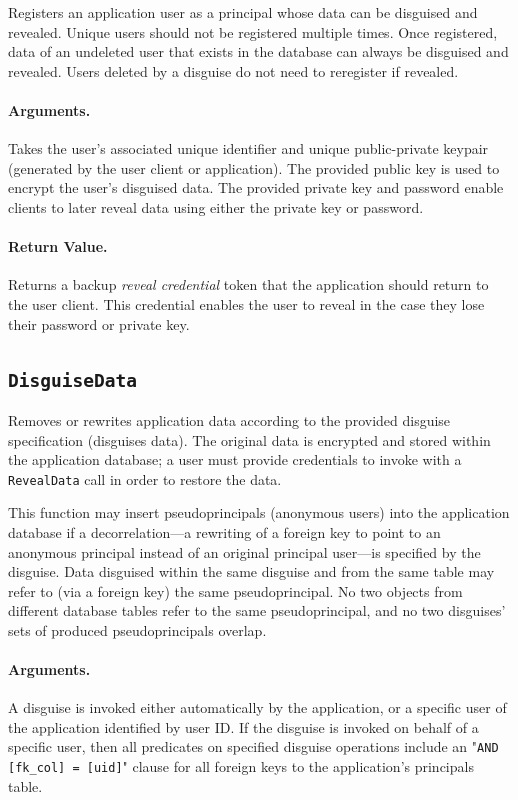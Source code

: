    Registers an application user as a principal whose data can be disguised and
    revealed. Unique users should not be registered multiple times.  Once
    registered, data of an undeleted user that exists in the database can always
    be disguised and revealed.
    Users deleted by a disguise do not need to reregister if revealed.

    \paragraph{Arguments.} Takes the user's associated unique identifier and unique
    public-private keypair (generated by the user
    client or application).
    The provided public key is used to encrypt the user's disguised data. The
    provided private key and password enable clients to later reveal data using
    either the private key or password.

    \paragraph{Return Value.} 
    Returns a backup \emph{reveal credential} token that the application should return to
    the user client. This credential enables the user to reveal in the case they lose
    their password or private key.


\subsection{\texttt{DisguiseData}}

    Removes or rewrites application data according to the provided disguise
    specification (\ie disguises data). The original data is encrypted and
    stored within the application database; a user must provide credentials to
    invoke with a \texttt{RevealData} call in order to restore the data.
    
    This function may insert pseudoprincipals (anonymous users) into the
    application database if a decorrelation---a rewriting of a foreign key to
    point to an anonymous principal instead of an original principal user---is
    specified by the disguise.  Data disguised within the same disguise and from
    the same table may refer to (via a foreign key) the same pseudoprincipal.
    No two objects from different database tables refer to the same
    pseudoprincipal, and no two disguises' sets of produced pseudoprincipals overlap.

    \paragraph{Arguments.} 
    A disguise is invoked either automatically by the application, or a specific
    user of the application identified by user ID. 
    If the disguise is invoked on behalf of a specific user, then all predicates
    on specified disguise operations include an "\texttt{AND [fk\_col] = [uid]}"
    clause for all foreign keys to the application's principals table.


